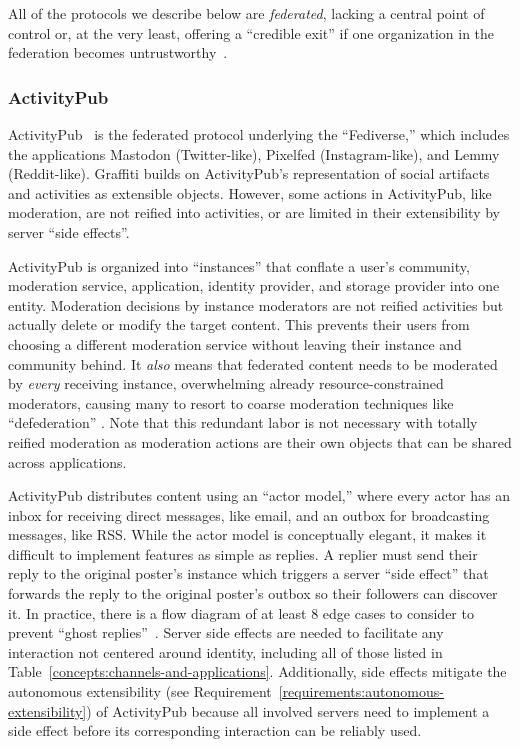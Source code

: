 All of the protocols we describe below are \emph{federated},
lacking a central point of control or,
at the very least, offering
a ``credible exit'' if one organization in the federation becomes
untrustworthy~\cite{howdecentralizedisbluesky}.

\subsubsection{ActivityPub}
\label{related-work:activitypub}

ActivityPub~\cite{activitypub} is the federated protocol underlying the
``Fediverse,'' which includes the applications
Mastodon (Twitter-like), Pixelfed (Instagram-like), and
Lemmy (Reddit-like).
Graffiti builds on ActivityPub's representation of social artifacts and
activities as extensible objects.
However, some actions in ActivityPub, like moderation, are not
reified into activities, or are
limited in their extensibility by server ``side effects''.

ActivityPub is organized into ``instances'' that conflate
a user's community, moderation service, application,
identity provider, and storage provider into one entity.
Moderation decisions by instance moderators are not reified activities
but actually delete or modify the target content.
This prevents their users from choosing a different moderation
service without leaving their instance and community
behind.
It \emph{also} means that federated content
needs to be moderated by \emph{every} receiving instance,
overwhelming already resource-constrained moderators, causing many
to resort to coarse moderation techniques like ``defederation''
\cite{securingfederatedplatforms, blocklistboundary}.
Note that this redundant labor is not necessary with totally
reified moderation as moderation actions are their own objects
that can be shared across applications.

ActivityPub distributes content using an ``actor model,''
where every actor has an inbox for receiving direct messages, like email,
and an outbox for broadcasting messages, like RSS.
While the actor model is conceptually elegant, it makes it difficult
to implement features as simple as replies.
A replier must send their reply to the original poster's instance which
triggers a server ``side effect'' that forwards the reply to the original
poster's outbox so their followers can discover it.
In practice, there is a flow diagram of at least 8 edge cases to consider
to prevent ``ghost replies''~\cite{stateofmastodon}.
Server side effects are needed to facilitate any interaction not centered around identity,
including all of those listed in Table~\ref{concepts:channels-and-applications}.
Additionally, side effects mitigate the autonomous extensibility
(see Requirement~\ref{requirements:autonomous-extensibility})
of ActivityPub
because all involved servers need to implement a side effect before
its corresponding interaction can be reliably used.

